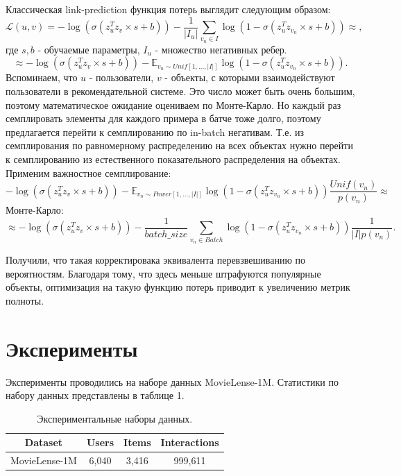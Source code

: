 \documentclass{article}
\begin{document}
Классическая link-prediction функция потерь выглядит следующим образом:
$$
\mathcal{L}(u, v) = -\log(\sigma(z_u^T z_v \times s + b)) - \frac{1}{|I_u|} \sum_{v_n \in I} \log(1 - \sigma(z_u^T z_{v_n} \times s + b)) \approx ,
$$
где $s, b$ - обучаемые параметры, $I_u$ - множество негативных ребер.
$$
\approx -\log(\sigma(z_u^T z_v \times s + b)) - \mathbb{E}_{v_n \sim Unif[1, \dots, |I|]} \log(1 - \sigma(z_u^T z_{v_n} \times s + b)).
$$
Вспоминаем, что $u$ - пользователи, $v$ - объекты, с которыми взаимодействуют пользователи в рекомендательной системе. Это число может быть очень большим,
поэтому математическое ожидание оцениваем по Монте-Карло. Но каждый раз семплировать элементы для каждого примера в батче тоже долго, поэтому предлагается
перейти к семплированию по in-batch негативам. Т.е. из семплирования по равномерному распределению на всех объектах нужно перейти к семплированию из естественного
показательного распределения на объектах. Применим важностное семплирование:
$$
-\log(\sigma(z_u^T z_v \times s + b)) - \mathbb{E}_{v_n \sim Power[1, \dots, |I|]} \log(1 - \sigma(z_u^T z_{v_n} \times s + b)) \frac{Unif(v_n)}{p(v_n)} \approx
$$
Монте-Карло:
$$
\approx -\log(\sigma(z_u^T z_v \times s + b)) - \frac{1}{batch\_size} \sum_{v_n \in Batch} \log(1 - \sigma(z_u^T z_{v_n} \times s + b)) \frac{1}{|I| p(v_n)}.
$$

Получили, что такая корректировака эквивалента перевзвешиванию по вероятностям. Благодаря тому, что здесь меньше штрафуются популярные объекты, оптимизация на
такую функцию потерь приводит к увеличению метрик полноты.

\section{Эксперименты}

Эксперименты проводились на наборе данных MovieLense-1M. Статистики по набору данных представлены в 
таблице 1.

\begin{table}[h]
    \centering
    \begin{tabular}{c|c|c|c}
        Dataset & Users & Items & Interactions\\
        \hline
        MovieLense-1M & 6,040 & 3,416 & 999,611 \\
    \end{tabular}
    \caption{Экспериментальные наборы данных.}
    \label{tab:my_label}
\end{table}
\end{document}
